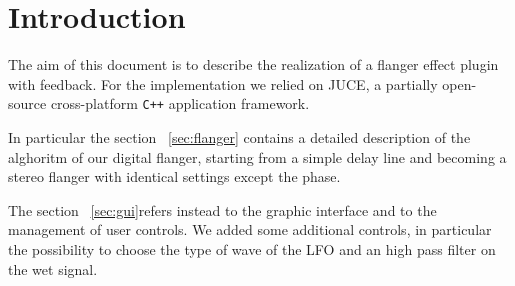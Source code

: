 \section{Introduction}

The aim of this document is to describe the realization of a flanger effect plugin with feedback. For the implementation we relied on JUCE, a partially open-source cross-platform \texttt{C++} application framework.

In particular the section ~\ref{sec:flanger} contains a detailed description of the alghoritm of our digital flanger, starting from a simple delay line and becoming a stereo flanger with identical settings except the phase.

The section ~\ref{sec:gui}refers instead to the graphic interface and to the management of user controls. We added some additional controls, in particular the possibility to choose the type of wave of the LFO and an high pass filter on the wet signal.